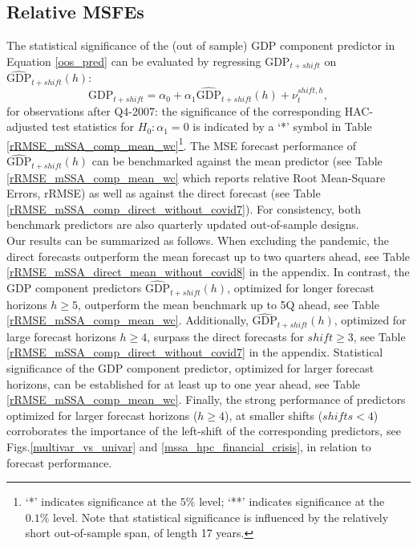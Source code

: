 \documentclass[11pt,a4paper]{article}
\begin{document}
\subsection{Relative MSFEs}\label{oosp}

The statistical significance of the (out of sample) GDP component predictor in Equation \eqref{oos_pred}  can be evaluated by regressing 
$\textrm{GDP}_{t+shift}$ on $\hat{\textrm{GDP}}_{t+shift}(h)$:
\begin{equation}\label{eq_gdp_pred}
\textrm{GDP}_{t+shift}=\alpha_0+\alpha_1\hat{\textrm{GDP}}_{t+shift}(h)+\nu_{t}^{shift,h},
\end{equation}
for observations after Q4-2007: the significance of the corresponding HAC-adjusted test statistics for $H_0 : \alpha_1 =0$ is indicated by a `*' symbol in Table \eqref{rRMSE_mSSA_comp_mean_wc}\footnote{`*' indicates significance at the $5\%$ level; `**' indicates significance at the $0.1\%$ level. Note that statistical significance is influenced by the relatively short out-of-sample span, of length 17 years.}. The MSE forecast performance of $\hat{\textrm{GDP}}_{t+shift}(h)$ can be benchmarked against the mean predictor (see Table \eqref{rRMSE_mSSA_comp_mean_wc} which reports relative Root Mean-Square Errors, rRMSE) as well as against the direct forecast (see Table \eqref{rRMSE_mSSA_comp_direct_without_covid7}). For consistency, both benchmark predictors are also quarterly updated out-of-sample designs.\\


Our results can be summarized as follows. When excluding the pandemic, the direct forecasts outperform the mean forecast up to two quarters ahead, see Table \eqref{rRMSE_mSSA_direct_mean_without_covid8} in the appendix. %
In contrast, the GDP component predictors $\hat{\textrm{GDP}}_{t+shift}(h)$, optimized for longer forecast horizons $h\geq 5$, outperform the mean benchmark up to 5Q ahead, see Table \eqref{rRMSE_mSSA_comp_mean_wc}. Additionally,  $\hat{\textrm{GDP}}_{t+shift}(h)$, optimized for large forecast horizons $h\geq 4$, surpass the direct forecasts for $shift\geq 3$, see Table \eqref{rRMSE_mSSA_comp_direct_without_covid7} in the appendix. Statistical significance of the GDP component predictor, optimized for larger forecast horizons, can be established for at least up to one year ahead, see Table \eqref{rRMSE_mSSA_comp_mean_wc}. Finally, the strong performance of predictors optimized for larger forecast horizons ($h\geq 4$), at smaller shifts ($shifts< 4$) corroborates the importance of the left-shift of the corresponding predictors, see Figs.\eqref{multivar_vs_univar} and \eqref{mssa_hpc_financial_crisis}, in relation to forecast performance.  
\end{document}
